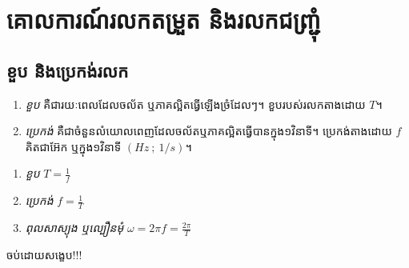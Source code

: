 \chapter{គោលការណ៍រលកតម្រួត និងរលកជញ្ជ្រុំ}
\section{ខួប និងប្រេកង់រលក}
\begin{definition}
	\begin{enumerate}[k]
		\item \emph{\kml ខួប} គឺជារយៈពេលដែលចល័ត ឬភាគល្អិតធ្វើឡើងច្រំដែលៗ។ ខួបរបស់រលកតាងដោយ $T$។
		\item \emph{\kml ប្រេកង់} គឺជាចំនួនលំយោលពេញដែលចល័តឬភាគល្អិតធ្វើបានក្នុង១វិនាទី។ ប្រេកង់តាងដោយ $f$ គិតជាអ៊ែក ឬក្នុង១វិនាទី $\left(Hz~;~1/s\right)$។
	\end{enumerate}
\end{definition}
	\begin{remark}
		\begin{enumerate}
			\item \emph{\kml ខួប} $T=\frac{1}{f}$
			\item \emph{\kml ប្រេកង់} $f=\frac{1}{T}$
			\item \emph{\kml ពុលសា​​ស្យុ​​ង ឬល្បឿនមុំ} $\omega = 2\pi f=\frac{2\pi}{T}$
		\end{enumerate}		
	\end{remark}
\begin{center}
	{\Large \kml\color{magenta} ចប់ដោយសង្ខេប!!!}
\end{center}
